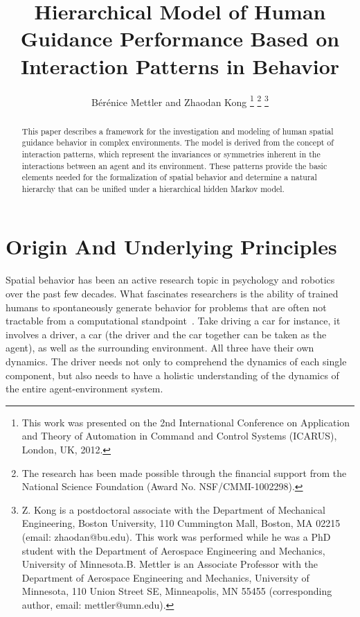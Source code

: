 \documentclass[journal]{IEEEtran}
\begin{document}
\title{Hierarchical Model of Human Guidance Performance Based on Interaction Patterns in Behavior}

\author{B\'{e}r\'{e}nice Mettler and Zhaodan Kong
\thanks{This work was presented on the 2nd International Conference on Application and Theory of Automation in Command and Control Systems (ICARUS), London, UK, 2012.}
\thanks{The research has been made possible through the financial support from the National Science Foundation (Award No. NSF/CMMI-1002298).}
\thanks{Z. Kong is a postdoctoral associate with the Department of Mechanical Engineering, Boston University, 110 Cummington Mall, Boston, MA 02215 (email: zhaodan@bu.edu). This work was performed while he was a PhD student with the Department of Aerospace Engineering and Mechanics, University of Minnesota.\newline B. Mettler is an Associate Professor with the Department of Aerospace Engineering and Mechanics, University of Minnesota, 110 Union Street SE, Minneapolis, MN 55455 (corresponding author, email: mettler@umn.edu).}
}


\maketitle

\begin{abstract}
This paper describes a framework for the investigation and modeling of human spatial guidance behavior in complex environments. The model is derived from the concept of interaction patterns, which represent the invariances or symmetries inherent in the interactions between an agent and its environment. These patterns provide the basic elements needed for the formalization of spatial behavior and determine a natural hierarchy that can be unified under a hierarchical hidden Markov model. 
\end{abstract}

\section{Origin And Underlying Principles}

Spatial behavior has been an active research topic in psychology and robotics over the past few decades. What fascinates researchers is the ability of trained humans to spontaneously generate behavior for problems that are often not tractable from a computational standpoint~\cite{Mettler11}. Take driving a car for instance, it involves a driver, a car (the driver and the car together can be taken as the agent), as well as the surrounding environment. All three have their own dynamics. The driver needs not only to comprehend the dynamics of each single component, but also needs to have a holistic understanding of the dynamics of the entire agent-environment system. 
\end{document}
